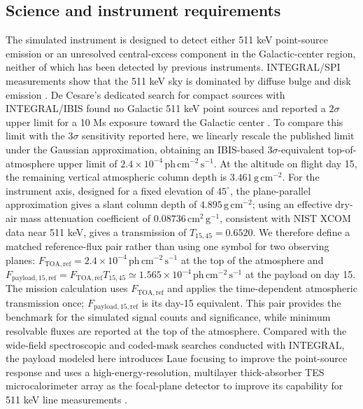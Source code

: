 \documentclass[11pt]{article}
\newcommand{\phcms}{\ensuremath{\,\mathrm{ph\,cm^{-2}\,s^{-1}}}}
\newcommand{\ftoaref}{F_{\mathrm{TOA,ref}}}
\newcommand{\fpayloadref}{F_{\mathrm{payload,15,ref}}}
\begin{document}
\subsection{Science and instrument requirements}
\label{sec:requirements}

\begingroup
{}

The simulated instrument is designed to detect either 511 keV point-source
emission or an unresolved central-excess component in the Galactic-center
region, neither of which has been detected by previous instruments.
INTEGRAL/SPI measurements show that the 511 keV sky is dominated by diffuse
bulge and disk emission \cite{Siegert2016AA,Yoneda2025}. De Cesare's dedicated
search for compact sources with INTEGRAL/IBIS found no Galactic 511 keV point
sources and reported a $2\sigma$ upper limit for a 10 Ms exposure toward the
Galactic center \cite{DeCesare2011}. To compare this limit with the $3\sigma$
sensitivity reported here, we linearly rescale the published limit under the
Gaussian approximation, obtaining an IBIS-based $3\sigma$-equivalent
top-of-atmosphere upper limit of $2.4\times10^{-4}\phcms$. At the altitude on
flight day 15, the remaining vertical atmospheric column depth is
$3.461\,\mathrm{g\,cm^{-2}}$. For the instrument axis, designed for a fixed
elevation of $45^\circ$, the plane-parallel approximation gives a slant column
depth of $4.895\,\mathrm{g\,cm^{-2}}$; using an effective dry-air mass
attenuation coefficient of $0.08736\,\mathrm{cm^2\,g^{-1}}$, consistent with NIST
XCOM data near 511 keV, gives a transmission of $T_{15,45}=0.6520$. We
therefore define a matched reference-flux pair rather than using one symbol for
two observing planes: $\ftoaref=2.4\times10^{-4}\phcms$ at the top of the
atmosphere and
$\fpayloadref=\ftoaref T_{15,45}\simeq1.565\times10^{-4}\phcms$ at the payload
on day 15. The mission calculation uses $\ftoaref$ and applies the
time-dependent atmospheric transmission once; $\fpayloadref$ is its day-15
equivalent. This pair provides the benchmark for the simulated signal counts
and significance, while minimum resolvable fluxes are reported at the top of
the atmosphere. Compared with the wide-field spectroscopic and
coded-mask searches conducted with INTEGRAL, the payload modeled here
introduces Laue focusing to improve the point-source response and uses a
high-energy-resolution, multilayer thick-absorber TES microcalorimeter array as
the focal-plane detector to improve its capability for 511 keV line
measurements \cite{Shirazi2023,Caputo2017}.
\end{document}
